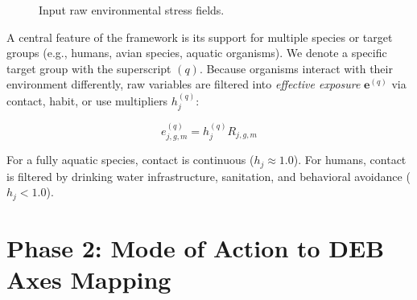 \documentclass[11pt,a4paper]{article}
\begin{document}
\begin{figure}[H]
\centering
\begin{subfigure}{0.45\textwidth}
\centering
{}
\end{subfigure}
\hfill
\begin{subfigure}{0.45\textwidth}
\centering
{}
\end{subfigure}
\caption{Input raw environmental stress fields.}
\end{figure}

A central feature of the framework is its support for multiple species or target groups (e.g., humans, avian species, aquatic organisms). We denote a specific target group with the superscript $(q)$. Because organisms interact with their environment differently, raw variables are filtered into \textit{effective exposure} $\bm{e}^{(q)}$ via contact, habit, or use multipliers $h_j^{(q)}$:

\begin{equation}
    e_{j, g, m}^{(q)} = h_{j}^{(q)} R_{j, g, m}
\end{equation}

For a fully aquatic species, contact is continuous ($h_j \approx 1.0$). For humans, contact is filtered by drinking water infrastructure, sanitation, and behavioral avoidance ($h_j < 1.0$). 

\section{Phase 2: Mode of Action to DEB Axes Mapping}
\end{document}
